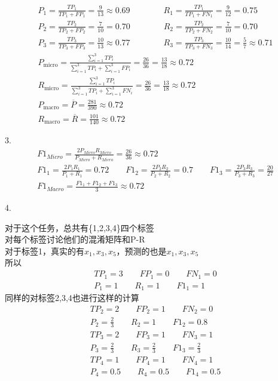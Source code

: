 \documentclass[8pt]{article}
\begin{document}
{\large
\begin{gather*}
P_1 = \frac{TP_1}{TP_1+FP_1} = \frac{9}{13}\approx 0.69
\qquad\qquad
R_1 = \frac{TP_1}{TP_1+FN_1} = \frac{9}{12} = 0.75 \\[0.2em]
P_2 = \frac{TP_2}{TP_2+FP_2} = \frac{7}{10}=0.70
\qquad\qquad
R_2 = \frac{TP_2}{TP_2+FN_2} = \frac{7}{10}=0.70 \\[0.2em]
P_3 = \frac{TP_3}{TP_3+FP_3} = \frac{10}{13}\approx 0.77
\qquad\qquad
R_3 = \frac{TP_3}{TP_3+FN_3} = \frac{10}{14} = \frac{5}{7}\approx 0.71 \\[0.7em]
P_{\mathrm{micro}}
=
\frac{\sum_{i=1}^{3} TP_i}
{\sum_{i=1}^{3} TP_i + \sum_{i=1}^{3} FP_i}
= \frac{26}{36}= \frac{13}{18}\approx 0.72 \\[0.25em]
R_{\mathrm{micro}}
=
\frac{\sum_{i=1}^{3} TP_i}
{\sum_{i=1}^{3} TP_i + \sum_{i=1}^{3} FN_i}
= \frac{26}{36}= \frac{13}{18}\approx 0.72 \\[0.25em]
P_{\mathrm{macro}}
=\overline{P}=\frac{281}{390}\approx 0.72 \\[0.2em]
R_{\mathrm{macro}}
=\overline{R}=\frac{101}{140}\approx 0.72
\end{gather*}
}

3.
{\large
\begin{gather*}
F1_{Micro}=\frac{2P_{Micro}R_{Micro}}{P_{Micro}+R_{Micro}}
=\frac{26}{36}\approx 0.72 \\[0.45em]
F1_1 = \frac{2P_1R_1}{P_1+R_1} = 0.72
\qquad
F1_2 = \frac{2P_2R_2}{P_2+R_2} = 0.7
\qquad
F1_3 = \frac{2P_3R_3}{P_3+R_3} =\frac{20}{27} \\[0.45em]
F1_{Macro}=\frac{F1_1+F1_2+F1_3}{3}\approx 0.72
\end{gather*}
}

4.

对于这个任务，总共有\{1,2,3,4\}四个标签\\
对每个标签讨论他们的混淆矩阵和P-R
\\
对于标签1，真实的有$x_1,x_3,x_5$，预测的也是$x_1,x_3,x_5$\\
所以
{\large
\begin{gather*}
TP_1 = 3 \qquad FP_1=0 \qquad FN_1=0 \\[0.3em]
P_1 = 1 \qquad R_1=1 \qquad F1_1=1
\end{gather*}
}
同样的对标签2,3,4也进行这样的计算
{\large
\begin{gather*}
TP_2 = 2 \qquad FP_2=1 \qquad FN_2=0 \\[0.3em]
P_2 = \frac{2}{3} \qquad R_2=1 \qquad F1_2=0.8 \\[0.7em]
TP_3 = 2 \qquad FP_3=1 \qquad FN_3=1 \\[0.3em]
P_3 = \frac{2}{3} \qquad R_3=\frac{2}{3} \qquad F1_3=\frac{2}{3} \\[0.7em]
TP_4 = 1 \qquad FP_4=1 \qquad FN_4=1 \\[0.3em]
P_4 = 0.5 \qquad R_4=0.5 \qquad F1_4=0.5
\end{gather*}
}
\end{document}

